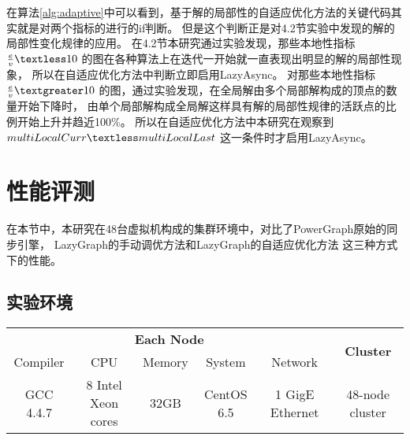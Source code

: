 在算法\ref{alg:adaptive}中可以看到，基于解的局部性的自适应优化方法的关键代码其实就是对两个指标的进行的if判断。
但是这个判断正是对4.2节实验中发现的解的局部性变化规律的应用。
在4.2节本研究通过实验发现，那些本地性指标$\frac{e}{v} \textless 10$ 的图在各种算法上在迭代一开始就一直表现出明显的解的局部性现象，
所以在自适应优化方法中判断立即启用LazyAsync。
对那些本地性指标$\frac{e}{v} \textgreater 10$ 的图，通过实验发现，在全局解由多个局部解构成的顶点的数量开始下降时，
由单个局部解构成全局解这样具有解的局部性规律的活跃点的比例开始上升并趋近100\%。
所以在自适应优化方法中本研究在观察到$  multiLocalCurr \textless multiLocalLast$ 这一条件时才启用LazyAsync。


\section{性能评测}

在本节中，本研究在48台虚拟机构成的集群环境中，对比了PowerGraph原始的同步引擎，
LazyGraph的手动调优方法和LazyGraph的自适应优化方法
这三种方式下的性能。

\subsection{实验环境}
\begin{table}[htb]
  \centering
  \label{tab:experimental_methodology}
    \begin{tabular}{cccccc}
     \toprule[1.5pt]
     \multicolumn{5}{c}{\textbf{Each Node}} &   \multirow{2}{*}{\textbf{Cluster}} \\
     \cmidrule(lr){1-5}
     Compiler & CPU & Memory & System & Network \\
     \midrule[1pt]
     GCC 4.4.7 & 8 Intel Xeon cores & 32GB & CentOS 6.5  & 1 GigE Ethernet & 48-node cluster\\
     \bottomrule[1.5pt]
    \end{tabular}
\end{table}



